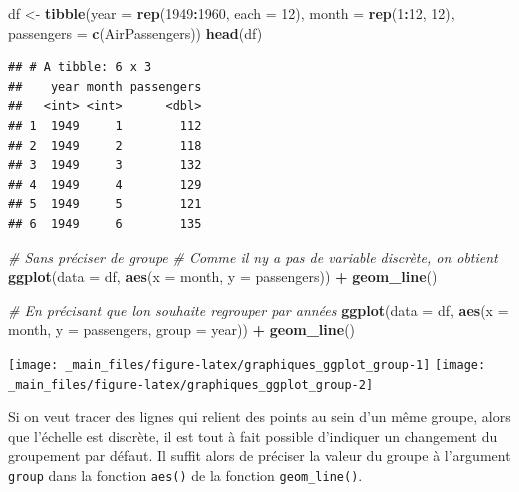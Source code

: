 \documentclass[
  11pt,
]{book}
\newenvironment{Shaded}{\begin{snugshade}}{\end{snugshade}}
\newcommand{\CommentTok}[1]{\textcolor[rgb]{0.56,0.35,0.01}{\textit{#1}}}
\newcommand{\DataTypeTok}[1]{\textcolor[rgb]{0.13,0.29,0.53}{#1}}
\newcommand{\DecValTok}[1]{\textcolor[rgb]{0.00,0.00,0.81}{#1}}
\newcommand{\KeywordTok}[1]{\textcolor[rgb]{0.13,0.29,0.53}{\textbf{#1}}}
\newcommand{\NormalTok}[1]{#1}
\newcommand{\OperatorTok}[1]{\textcolor[rgb]{0.81,0.36,0.00}{\textbf{#1}}}
\newcommand{\StringTok}[1]{\textcolor[rgb]{0.31,0.60,0.02}{#1}}
\numberwithin{equation}{section}
\numberwithin{countremarque}{section}
\begin{document}
\begin{Shaded}
\begin{Highlighting}[]
\NormalTok{df \textless{}{-}}\StringTok{ }\KeywordTok{tibble}\NormalTok{(}\DataTypeTok{year =} \KeywordTok{rep}\NormalTok{(}\DecValTok{1949}\OperatorTok{:}\DecValTok{1960}\NormalTok{, }\DataTypeTok{each =} \DecValTok{12}\NormalTok{),}
           \DataTypeTok{month =} \KeywordTok{rep}\NormalTok{(}\DecValTok{1}\OperatorTok{:}\DecValTok{12}\NormalTok{, }\DecValTok{12}\NormalTok{),}
           \DataTypeTok{passengers =} \KeywordTok{c}\NormalTok{(AirPassengers))}
\KeywordTok{head}\NormalTok{(df)}
\end{Highlighting}
\end{Shaded}

\begin{lstlisting}
## # A tibble: 6 x 3
##    year month passengers
##   <int> <int>      <dbl>
## 1  1949     1        112
## 2  1949     2        118
## 3  1949     3        132
## 4  1949     4        129
## 5  1949     5        121
## 6  1949     6        135
\end{lstlisting}

\begin{Shaded}
\begin{Highlighting}[]
\CommentTok{\# Sans préciser de groupe}
\CommentTok{\# Comme il n\textquotesingle{}y a pas de variable discrète, on obtient }
\KeywordTok{ggplot}\NormalTok{(}\DataTypeTok{data =}\NormalTok{ df, }\KeywordTok{aes}\NormalTok{(}\DataTypeTok{x =}\NormalTok{ month, }\DataTypeTok{y =}\NormalTok{ passengers)) }\OperatorTok{+}\StringTok{ }\KeywordTok{geom\_line}\NormalTok{()}

\CommentTok{\# En précisant que l\textquotesingle{}on souhaite regrouper par années}
\KeywordTok{ggplot}\NormalTok{(}\DataTypeTok{data =}\NormalTok{ df, }\KeywordTok{aes}\NormalTok{(}\DataTypeTok{x =}\NormalTok{ month, }\DataTypeTok{y =}\NormalTok{ passengers, }\DataTypeTok{group =}\NormalTok{ year)) }\OperatorTok{+}\StringTok{ }\KeywordTok{geom\_line}\NormalTok{()}
\end{Highlighting}
\end{Shaded}

\begin{center}\texttt{[image: \_main\_files/figure-latex/graphiques\_ggplot\_group-1]} \texttt{[image: \_main\_files/figure-latex/graphiques\_ggplot\_group-2]} \end{center}

Si on veut tracer des lignes qui relient des points au sein d'un même groupe, alors que l'échelle est discrète, il est tout à fait possible d'indiquer un changement du groupement par défaut. Il suffit alors de préciser la valeur du groupe à l'argument \texttt{group} dans la fonction \texttt{aes()} de la fonction \texttt{geom\_line()}.
\end{document}
